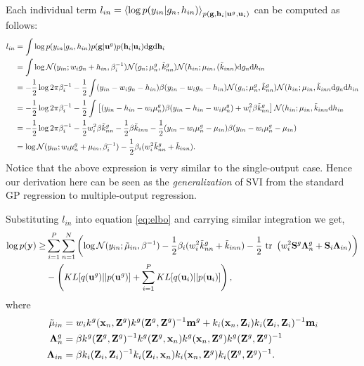 \documentclass{article} %
\begin{document}
\noindent Each individual term $l_{in} = \left\langle \log p(y_{in} | g_n, h_{in}) \right\rangle_{p(\mathbf{g},\mathbf{h}_i | \mathbf{u}^g, \mathbf{u}_i)}$ can be computed as follows:
\begin{align}
\nonumber
l_{in} &= \int \log p(y_{in} | g_n, h_{in}) p(\mathbf{g} | \mathbf{u}^g) p(\mathbf{h}_i | \mathbf{u}_i) \mathrm{d} \mathbf{g} \mathrm{d} \mathbf{h}_i \\
\nonumber
&= \int \log \mathcal{N}(y_{in} ; w_i g_n + h_{in}, \beta_i^{-1}) 
\mathcal{N}(g_n ; \mu^g_n, \tilde{k}^g_{nn})
\mathcal{N}(h_{in} ; \mu_{in}, (\tilde{k}_{inn}) \mathrm{d} g_n \mathrm{d} h_{in} \\
\nonumber
&= -\frac{1}{2} \log 2 \pi \beta_i^{-1} - \frac{1}{2} \int (y_{in} - w_i g_n - h_{in}) \beta (y_{in} - w_i g_n - h_{in})
\mathcal{N}(g_n ; \mu^g_n, \tilde{k}^g_{nn})
\mathcal{N}(h_{in} ; \mu_{in}, \tilde{k}_{inn} \mathrm{d} g_n \mathrm{d} h_{in} \\
\nonumber
&= -\frac{1}{2} \log 2 \pi \beta_i^{-1} - \frac{1}{2} \int \left[(y_{in} - h_{in} - w_i \mu^g_n) \beta (y_{in} - h_{in} - w_i \mu^g_n) + w_i^2 \beta \tilde{k}^g_{nn} \right] 
\mathcal{N}(h_{in} ; \mu_{in}, \tilde{k}_{inn} \mathrm{d} h_{in} \\
\nonumber
&= -\frac{1}{2} \log 2 \pi \beta_i^{-1} - \frac{1}{2} w_i^2 \beta \tilde{k}^g_{nn}
- \frac{1}{2} \beta \tilde{k}_{inn} - \frac{1}{2} (y_{in} - w_i \mu^g_n - \mu_{in}) \beta (y_{in} - w_i \mu^g_n - \mu_{in}) \\
&= \log \mathcal{N}(y_{in}; w_i \mu^g_n + \mu_{in}, \beta_i^{-1})  - \frac{1}{2} \beta_i (w_i^2 \tilde{k}^g_{nn} + \tilde{k}_{inn}).
\end{align}
Notice that the above expression is very similar to the single-output case.
Hence our derivation here can be seen as the \textit{generalization} of SVI from the standard GP regression to multiple-output regression.

\noindent Substituting $l_{in}$ into equation \ref{eq:elbo} and carrying similar integration we get,
\begin{align}
\nonumber
\log p(\mathbf{y})
\ge& \sum_{i=1}^P \sum_{n=1}^N
 \left( \log \mathcal{N}(y_{in}; \tilde{\mu}_{in}, \beta^{-1})
         - \frac{1}{2} \beta_i (w_i^2 \tilde{k}^g_{nn} + \tilde{k}_{inn})
         - \frac{1}{2} \mbox{ \rm tr } \left( w_i^2 \mathbf{S}^g \mathbf{\Lambda}^g_n + \mathbf{S}_i \mathbf{\Lambda}_{in} \right)
\right) \\
&- \left( KL[q(\mathbf{u}^g) || p(\mathbf{u}^g)] + \sum_{i=1}^P KL[q(\mathbf{u}_i) || p(\mathbf{u}_i)] \right),
\end{align}
where 
\begin{align}
\tilde{\mu}_{in}
&= w_i k^g(\mathbf{x}_n, \mathbf{Z}^g)k^g(\mathbf{Z}^g,\mathbf{Z}^g)^{-1}\mathbf{m}^g + k_i(\mathbf{x}_n, \mathbf{Z}_i)k_i(\mathbf{Z}_i,\mathbf{Z}_i)^{-1}\mathbf{m}_i \\
\mathbf{\Lambda}^g_n
&= \beta k^g(\mathbf{Z}^g,\mathbf{Z}^g)^{-1} k^g(\mathbf{Z}^g, \mathbf{x}_n) k^g(\mathbf{x}_n, \mathbf{Z}^g) k^g(\mathbf{Z}^g,\mathbf{Z}^g)^{-1} \\
\mathbf{\Lambda}_{in}
&= \beta k_i(\mathbf{Z}_i,\mathbf{Z}_i)^{-1} k_i(\mathbf{Z}_i, \mathbf{x}_n) k_i(\mathbf{x}_n, \mathbf{Z}^g) k_i(\mathbf{Z}^g,\mathbf{Z}^g)^{-1}.
\end{align}
\end{document}
